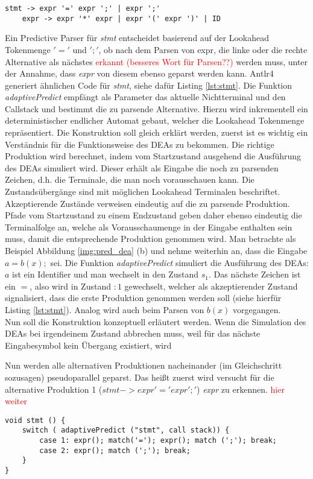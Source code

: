 \begin{lstlisting}[style=grammar, label=lst:expr_grammar]
    stmt -> expr '=' expr ';' | expr ';'
    expr -> expr '*' expr | expr '(' expr ')' | ID
\end{lstlisting}

Ein Predictive Parser für \textit{stmt} entscheidet basierend auf der Lookahead Tokenmenge ${'='}$ und ${';'}$, ob nach dem Parsen von expr, die linke oder die rechte Alternative
als nächstes \textcolor{red}{erkannt (besseres Wort für Parsen??)} werden muss, unter der Annahme, dass \textit{expr} von diesem ebenso geparst werden kann.
Antlr4 generiert ähnlichen Code für \textit{stmt}, siehe dafür Listing \ref{lst:stmt}.
Die Funktion \textit{adaptivePredict} empfängt als Parameter das aktuelle Nichtterminal und den Callstack und bestimmt die zu parsende Alternative.
Hierzu wird inkrementell ein deterministischer endlicher Automat gebaut, welcher die Lookahead Tokenmenge repräsentiert. 
Die Konstruktion soll gleich erklärt werden, zuerst ist es wichtig ein Verständnis für die Funktionsweise des DEAs zu bekommen. 
Die richtige Produktion wird berechnet, indem vom Startzustand ausgehend die Ausführung des DEAs simuliert wird. 
Dieser erhält als Eingabe die noch zu parsenden Zeichen, d.h. die Terminale, die man noch vorausschauen kann.
Die Zustandsübergänge sind mit möglichen Lookahead Terminalen beschriftet. 
Akzeptierende Zustände verweisen eindeutig auf die zu parsende Produktion. 
Pfade vom Startzustand zu einem Endzustand geben daher ebenso eindeutig die Terminalfolge an,
welche als Vorausschaumenge in der Eingabe enthalten sein muss, damit die entsprechende Produktion genommen wird. 
Man betrachte als Beispiel Abbildung \ref{img:pred_dea} (b) und nehme weiterhin an, dass die Eingabe $a=b(x);$ sei. 
Die Funktion \textit{adaptivePredict} simuliert die Ausführung des DEAs: $a$ ist ein Identifier und man wechselt in den Zustand $s_1$. Das nächste Zeichen ist ein $=$, also 
wird in Zustand $:1$ gewechselt, welcher als akzeptierender Zustand signalisiert, dass die erste Produktion genommen werden soll (siehe hierfür Listing \ref{lst:stmt}). 
Analog wird auch beim Parsen von $b(x)$ vorgegangen.\\
Nun soll die Konstruktion konzeptuell erläutert werden. 
Wenn die Simulation des DEAs bei irgendeinem Zustand abbrechen muss, weil für das nächste Eingabesymbol kein Übergang existiert,
wird 


Nun werden alle alternativen Produktionen nacheinander (im Gleichschritt sozusagen) pseudoparallel geparst.
Das heißt zuerst wird versucht für die alternative Produktion 1 ($stmt -> expr '=' expr ';'$) \textit{expr} zu erkennen. 
\textcolor{red}{hier weiter}  


\begin{lstlisting}[style=CStyle, frame=b, caption=Code zum Erkennen von stmt,label=lst:stmt]   
void stmt () { 
    switch ( adaptivePredict ("stmt", call stack)) {
        case 1: expr(); match('='); expr(); match (';'); break;
        case 2: expr(); match (';'); break;
    }   
}
\end{lstlisting}



